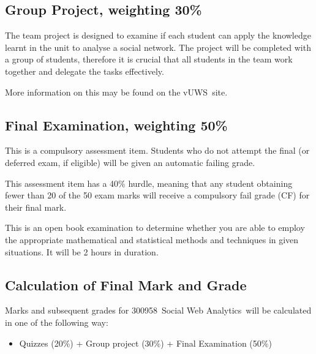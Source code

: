 \documentclass[a4paper,oneside]{book}
\newcommand{\vuws}{vUWS}
\newcommand{\unitcode}{300958}
\newcommand{\unitname}{Social Web Analytics}
\begin{document}
\subsection*{Group Project, weighting 30\%}

The team project is designed to examine if each student can apply the
knowledge learnt in the unit to analyse a social network.  The project
will be completed with a group of students, therefore it is crucial
that all students in the team work together and delegate the tasks
effectively.

More information on this may be found on the \vuws~site.


\subsection*{Final Examination, weighting 50\%}

This is a compulsory assessment item. Students who do not attempt the
final (or deferred exam, if eligible) will be given an automatic
failing grade.

This assessment item has a 40\% hurdle, meaning that any student
obtaining fewer than 20 of the 50 exam marks will receive a compulsory
fail grade (CF) for their final mark.

This is an open book examination to determine whether you are able to
employ the appropriate mathematical and statistical methods and
techniques in given situations. It will be 2 hours in duration.




\subsection*{Calculation of Final Mark and Grade}




Marks and subsequent grades for \unitcode~\unitname~will be
calculated in one of the following way:
\begin{itemize}
\item
  Quizzes (20\%) + Group project (30\%) + Final Examination (50\%)
\end{itemize}
\end{document}
